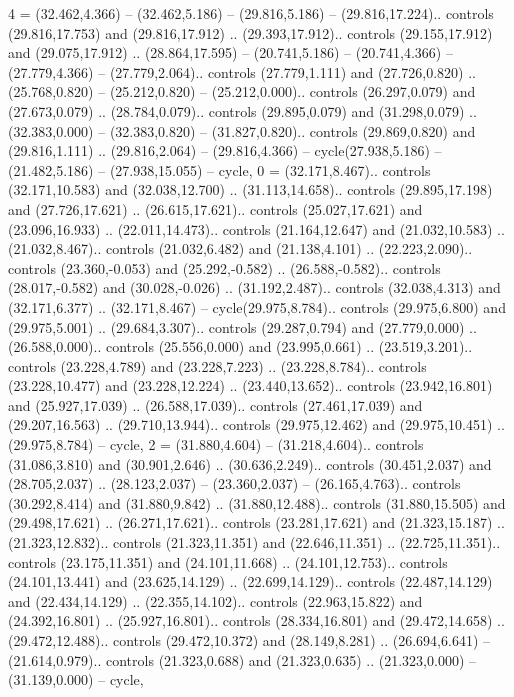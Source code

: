 {4} = {(32.462,4.366) -- (32.462,5.186) -- (29.816,5.186) -- (29.816,17.224).. controls (29.816,17.753) and (29.816,17.912) .. (29.393,17.912).. controls (29.155,17.912) and (29.075,17.912) .. (28.864,17.595) -- (20.741,5.186) -- (20.741,4.366) -- (27.779,4.366) -- (27.779,2.064).. controls (27.779,1.111) and (27.726,0.820) .. (25.768,0.820) -- (25.212,0.820) -- (25.212,0.000).. controls (26.297,0.079) and (27.673,0.079) .. (28.784,0.079).. controls (29.895,0.079) and (31.298,0.079) .. (32.383,0.000) -- (32.383,0.820) -- (31.827,0.820).. controls (29.869,0.820) and (29.816,1.111) .. (29.816,2.064) -- (29.816,4.366) -- cycle(27.938,5.186) -- (21.482,5.186) -- (27.938,15.055) -- cycle},
{0} = {(32.171,8.467).. controls (32.171,10.583) and (32.038,12.700) .. (31.113,14.658).. controls (29.895,17.198) and (27.726,17.621) .. (26.615,17.621).. controls (25.027,17.621) and (23.096,16.933) .. (22.011,14.473).. controls (21.164,12.647) and (21.032,10.583) .. (21.032,8.467).. controls (21.032,6.482) and (21.138,4.101) .. (22.223,2.090).. controls (23.360,-0.053) and (25.292,-0.582) .. (26.588,-0.582).. controls (28.017,-0.582) and (30.028,-0.026) .. (31.192,2.487).. controls (32.038,4.313) and (32.171,6.377) .. (32.171,8.467) -- cycle(29.975,8.784).. controls (29.975,6.800) and (29.975,5.001) .. (29.684,3.307).. controls (29.287,0.794) and (27.779,0.000) .. (26.588,0.000).. controls (25.556,0.000) and (23.995,0.661) .. (23.519,3.201).. controls (23.228,4.789) and (23.228,7.223) .. (23.228,8.784).. controls (23.228,10.477) and (23.228,12.224) .. (23.440,13.652).. controls (23.942,16.801) and (25.927,17.039) .. (26.588,17.039).. controls (27.461,17.039) and (29.207,16.563) .. (29.710,13.944).. controls (29.975,12.462) and (29.975,10.451) .. (29.975,8.784) -- cycle},
{2} = {(31.880,4.604) -- (31.218,4.604).. controls (31.086,3.810) and (30.901,2.646) .. (30.636,2.249).. controls (30.451,2.037) and (28.705,2.037) .. (28.123,2.037) -- (23.360,2.037) -- (26.165,4.763).. controls (30.292,8.414) and (31.880,9.842) .. (31.880,12.488).. controls (31.880,15.505) and (29.498,17.621) .. (26.271,17.621).. controls (23.281,17.621) and (21.323,15.187) .. (21.323,12.832).. controls (21.323,11.351) and (22.646,11.351) .. (22.725,11.351).. controls (23.175,11.351) and (24.101,11.668) .. (24.101,12.753).. controls (24.101,13.441) and (23.625,14.129) .. (22.699,14.129).. controls (22.487,14.129) and (22.434,14.129) .. (22.355,14.102).. controls (22.963,15.822) and (24.392,16.801) .. (25.927,16.801).. controls (28.334,16.801) and (29.472,14.658) .. (29.472,12.488).. controls (29.472,10.372) and (28.149,8.281) .. (26.694,6.641) -- (21.614,0.979).. controls (21.323,0.688) and (21.323,0.635) .. (21.323,0.000) -- (31.139,0.000) -- cycle},
